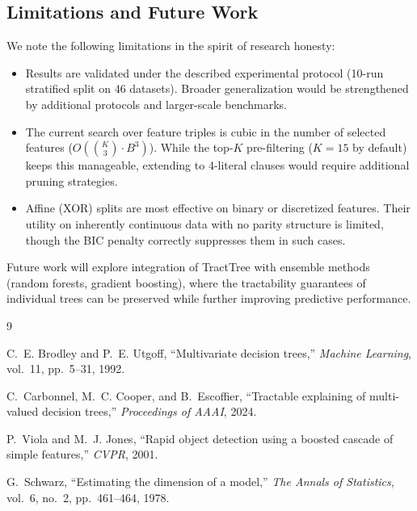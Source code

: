 \documentclass[11pt,a4paper]{article}
\begin{document}
\subsection{Limitations and Future Work}

We note the following limitations in the spirit of research honesty:

\begin{itemize}[leftmargin=2em]
    \item Results are validated under the described experimental protocol (10-run stratified split on 46 datasets). Broader generalization would be strengthened by additional protocols and larger-scale benchmarks.
    \item The current search over feature triples is cubic in the number of selected features ($O(\binom{K}{3} \cdot B^3)$). While the top-$K$ pre-filtering ($K = 15$ by default) keeps this manageable, extending to 4-literal clauses would require additional pruning strategies.
    \item Affine (XOR) splits are most effective on binary or discretized features. Their utility on inherently continuous data with no parity structure is limited, though the BIC penalty correctly suppresses them in such cases.
\end{itemize}

Future work will explore integration of TractTree with ensemble methods (random forests, gradient boosting), where the tractability guarantees of individual trees can be preserved while further improving predictive performance.

\begin{thebibliography}{9}

C.~E. Brodley and P.~E. Utgoff,
``Multivariate decision trees,''
\textit{Machine Learning}, vol.~11, pp.~5--31, 1992.

C.~Carbonnel, M.~C. Cooper, and B.~Escoffier,
``Tractable explaining of multi-valued decision trees,''
\textit{Proceedings of AAAI}, 2024.

P.~Viola and M.~J. Jones,
``Rapid object detection using a boosted cascade of simple features,''
\textit{CVPR}, 2001.

G.~Schwarz,
``Estimating the dimension of a model,''
\textit{The Annals of Statistics}, vol.~6, no.~2, pp.~461--464, 1978.

\end{thebibliography}
\end{document}
